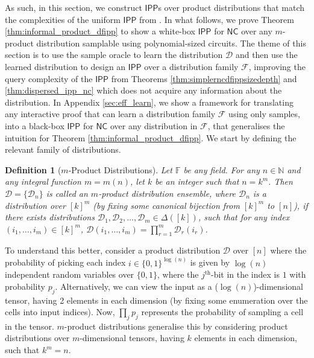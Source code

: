 \documentclass[10pt,a4paper]{article}
\newtheorem{definition}{Definition}[section]
\newcommand{\NC}{\mathsf{NC}}
\newcommand{\IPP}{\mathsf{IPP}}
\newcommand{\F}{\mathbb{F}}
\newcommand{\N}{\mathbb{N}}
\newcommand{\sD}{\mathcal{D}}
\newcommand{\sF}{\mathcal{F}}
\begin{document}
As such, in this section, we construct $\IPP$s over product distributions that match the complexities of the uniform $\IPP$ from \cite{RVW}. In what follows, we prove Theorem \ref{thm:informal_product_dfipp} to show a white-box $\IPP$ for $\NC$ over any $m$-product distribution samplable using polynomial-sized circuits. The theme of this section is to use the sample oracle to learn the distribution $\sD$ and then use the learned distribution to design an $\IPP$ over a distribution family $\sF$, improving the query complexity of the $\IPP$ from Theorems \ref{thm:simplerncdfippsizedepth} and \ref{thm:dispersed_ipp_nc} which does not acquire any information about the distribution. In Appendix \ref{sec:eff_learn}, we show a framework for translating any interactive proof that can learn a distribution family $\sF$ using only samples, into a black-box $\IPP$ for $\NC$ over any distribution in $\sF$, that generalises the intuition for Theorem \ref{thm:informal_product_dfipp}. We start by defining the relevant family of distributions.


\begin{definition}[$m$-Product Distributions]
\label{def:prod_dist}
Let $\F$ be any field. For any $n \in \N$ and any integral function $m = m(n)$, let $k$ be an integer such that $n = k^m$. Then $\mathcal{D}=\{\sD_n\}$ is called an $m$-product distribution ensemble, where $\sD_n$ is a distribution over $[k]^m$ (by fixing some canonical bijection from $[k]^m$ to $[n]$), if there exists distributions $\sD_1, \sD_2, \dots, \sD_m \in \Delta([k])$, such that for any index $(i_1, \dots, i_m) \in [k]^m$, $\sD(i_1, \dots, i_m) = \prod_{r=1}^m \sD_r(i_r)$.
\end{definition}

To understand this better, consider a product distribution $\sD$ over $[n]$ where the probability of picking each index $i \in \{0,1\}^{\log(n)}$ is given by $\log(n)$ independent random variables over $\{0,1\}$, where the $j^{\text{th}}$-bit in the index is $1$ with probability $p_j$. Alternatively, we can view the input as a ($\log(n)$)-dimensional tensor, having 2 elements in each dimension (by fixing some enumeration over the cells into input indices). Now, $\prod_j p_j$ represents the probability of sampling a cell in the tensor. $m$-product distributions generalise this by considering product distributions over $m$-dimensional tensors, having $k$ elements in each dimension, such that $k^m = n$. 
\end{document}
